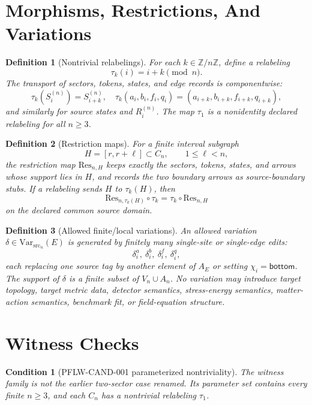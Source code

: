 \documentclass[11pt]{article}
\newcommand{\VarSrc}{\mathrm{Var}_{\mathrm{src}}}
\newcommand{\Restrict}{\mathrm{Res}}
\newtheorem{definition}{Definition}
\newtheorem{condition}{Condition}
\begin{document}
\section{Morphisms, Restrictions, And Variations}

\begin{definition}[Nontrivial relabelings]
For each \(k\in\mathbb{Z}/n\mathbb{Z}\), define a relabeling
\[
  \tau_k(i)=i+k\pmod n.
\]
The transport of sectors, tokens, states, and edge records is componentwise:
\[
  \tau_k(S_i^{(n)})=S_{i+k}^{(n)},\quad
  \tau_k(a_i,b_i,f_i,q_i)=(a_{i+k},b_{i+k},f_{i+k},q_{i+k}),
\]
and similarly for source states and \(R_i^{(n)}\). The map \(\tau_1\) is a
nonidentity declared relabeling for all \(n\ge 3\).
\end{definition}

\begin{definition}[Restriction maps]
For a finite interval subgraph
\[
  H=[r,r+\ell]\subset C_n,\qquad 1\le \ell<n,
\]
the restriction map \(\Restrict_{n,H}\) keeps exactly the sectors, tokens,
states, and arrows whose support lies in \(H\), and records the two boundary
arrows as source-boundary stubs. If a relabeling sends \(H\) to
\(\tau_k(H)\), then
\[
  \Restrict_{n,\tau_k(H)}\circ \tau_k
  = \tau_k\circ \Restrict_{n,H}
\]
on the declared common source domain.
\end{definition}

\begin{definition}[Allowed finite/local variations]
An allowed variation \(\delta\in\VarSrc_n(E)\) is generated by finitely many
single-site or single-edge edits:
\[
  \delta_i^{a},\ \delta_i^{b},\ \delta_i^{f},\ \delta_i^{q},
\]
each replacing one source tag by another element of \(A_E\) or setting
\(\chi_i=\mathsf{bottom}\). The support of \(\delta\) is a finite subset of
\(V_n\cup A_n\). No variation may introduce target topology, target metric
data, detector semantics, stress-energy semantics, matter-action semantics,
benchmark fit, or field-equation structure.
\end{definition}

\section{Witness Checks}

\begin{condition}[PFLW-CAND-001 parameterized nontriviality]
The witness family is not the earlier two-sector case renamed. Its parameter
set contains every finite \(n\ge 3\), and each \(C_n\) has a nontrivial
relabeling \(\tau_1\).
\end{condition}
\end{document}
